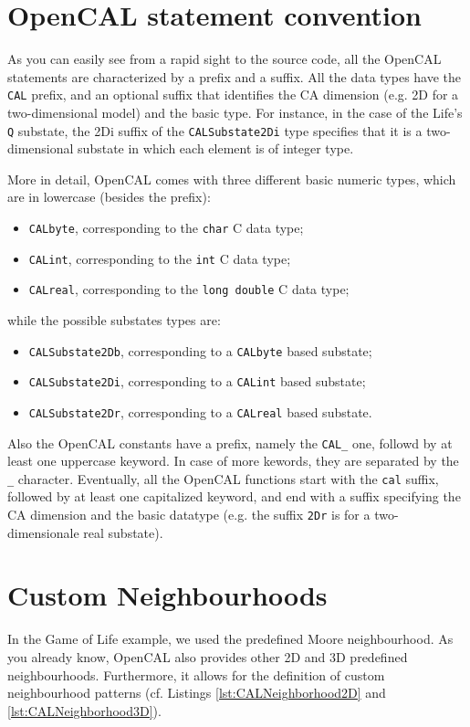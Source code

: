 \section{OpenCAL statement convention}
As you can easily see from a rapid sight to the source code, all the
OpenCAL statements are characterized by a prefix and a suffix. All the
data types have the \verb'CAL' prefix, and an optional suffix that
identifies the CA dimension (e.g. 2D for a two-dimensional model) and
the basic type. For instance, in the case of the Life's \verb'Q'
substate, the 2Di suffix of the \verb'CALSubstate2Di' type specifies
that it is a two-dimensional substate in which each element is of
integer type.

More in detail, OpenCAL comes with three different basic numeric
types, which are in lowercase (besides the prefix):
\begin{itemize}
\item \verb'CALbyte', corresponding to the \verb'char' C data type;
\item \verb'CALint', corresponding to the \verb'int' C data type;
\item \verb'CALreal', corresponding to the \verb'long double' C data type;
\end{itemize}
while the possible substates types are:
\begin{itemize}
\item \verb'CALSubstate2Db', corresponding to a \verb'CALbyte' based substate;
\item \verb'CALSubstate2Di', corresponding to a \verb'CALint' based substate;
\item \verb'CALSubstate2Dr', corresponding to a \verb'CALreal' based substate.
\end{itemize}
Also the OpenCAL constants have a prefix, namely the \verb'CAL_' one,
followd by at least one uppercase keyword. In case of more kewords,
they are separated by the \verb'_' character. Eventually, all the
OpenCAL functions start with the \verb'cal' suffix, followed by at
least one capitalized keyword, and end with a suffix specifying the CA
dimension and the basic datatype (e.g. the suffix \verb'2Dr' is for a
two-dimensionale real substate).

\section{Custom Neighbourhoods}\label{sec:CustomNeiughbourhoods}
In the Game of Life example, we used the predefined Moore
neighbourhood. As you already know, OpenCAL also provides other 2D and
3D predefined neighbourhoods. Furthermore, it allows for the
definition of custom neighbourhood patterns (cf. Listings
\ref{lst:CALNeighborhood2D} and \ref{lst:CALNeighborhood3D}).


